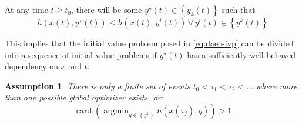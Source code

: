 \documentclass[twoside,leqno, twocolumn]{article}
\DeclareMathOperator*{\argmin}{\arg\min}
\DeclareMathOperator{\card}{\mathrm{card}}
\newtheorem{assumption}{Assumption}[section]
\begin{document}
At any time $t \geq t_0$, there will be some $y^\star(t)\in\left\{y_k(t)\right\}$ such that
\begin{equation}
	h(x(t), y^\star(t))\leq h(x(t),y^i(t))\, \forall\,y^i(t)\in\left\{y^k(t)\right\} 
\end{equation}

This implies that the initial value problem posed in \eqref{eq:daeo-ivp} can be divided into a sequence of initial-value problems if $y^\star(t)$ has a sufficiently well-behaved dependency on $x$ and $t$\cite{deussenNumericalSimulationDifferentialalgebraic2023}.

\begin{assumption}
	\label{assume:events-exist}
	There is only a finite set of events $t_0 < \tau_1 < \tau_2 < \ldots$ where more than one possible global optimizer exists, or:
	\begin{equation*}
		\card\left(\argmin_{y\in\left\{y^k\right\}}h(x(\tau_j), y)\right) > 1
	\end{equation*}
\end{assumption}
\end{document}
